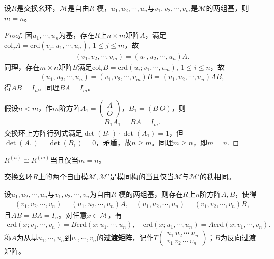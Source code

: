 \documentclass[../../main.tex]{subfiles}%
\begin{document}
\begin{theorem}
设$R$是交换幺环，$\mathscr{M}$是自由$R$-模，$u_1,u_2,\cdots,u_n$与$v_1,v_2,\cdots,v_m$是$\mathscr{M}$的两组基，则$m=n$。
\end{theorem}

\begin{proof}

因$u_1,\cdots,u_n$为基，存在$R$上$n\times m$矩阵$A$，满足$\mathrm{col}_j A=\mathrm{crd}(v_j;u_1,\cdots,u_n),\ 1\leqslant j\leqslant m$，故
\begin{align*}
(v_1,v_2,\cdots,v_m)=(u_1,u_2,\cdots,u_n)A.
\end{align*}
同理，存在$m\times n$矩阵$B$满足$\mathrm{col}_i B=\mathrm{crd}(u_i;v_1,\cdots,v_m),\ 1\leqslant i\leqslant n$，故
\begin{align*}
(u_1,u_2,\cdots,u_n)=(v_1,v_2,\cdots,v_m)B=(u_1,u_2,\cdots,u_n)AB,
\end{align*}
得$AB=I_n$。同理$BA=I_m$。

假设$n<m$，作$m$阶方阵$A_1=\begin{pmatrix}A\\O\end{pmatrix}$，$B_1=(B\ O)$，则
\begin{align*}
B_1 A_1=BA=I_m.
\end{align*}
交换环上方阵行列式满足$\det(B_1)\cdot\det(A_1)=1$，但$\det(A_1)=\det(B_1)=0$，矛盾，故$n\geqslant m$。同理$m\geqslant n$，即$m=n$.

\end{proof}

\begin{corollary}
$R^{(n)}\cong R^{(m)}$当且仅当$m=n$。
\end{corollary}

\begin{corollary}
交换幺环$R$上的两个自由模$\mathscr{M},\mathscr{M}'$是模同构的当且仅当$\mathscr{M}$与$\mathscr{M}'$的秩相同。
\end{corollary}

\begin{corollary}
设$u_1,u_2,\cdots,u_n$与$v_1,v_2,\cdots,v_n$为自由$R$-模的两组基，则存在$R$上$n$阶方阵$A,B$，使得
\begin{align*}
(v_1,v_2,\cdots,v_n)=(u_1,u_2,\cdots,u_n)A,\quad (u_1,u_2,\cdots,u_n)=(v_1,v_2,\cdots,v_n)B,
\end{align*}
且$AB=BA=I_n$。对任意$x\in\mathscr{M}$，有
\begin{align*}
\mathrm{crd}(x;v_1,\cdots,v_n)=B\mathrm{crd}(x;u_1,\cdots,u_n),\quad \mathrm{crd}(x;u_1,\cdots,u_n)=A\mathrm{crd}(x;v_1,\cdots,v_n).
\end{align*}
称$A$为从基$u_1,\cdots,u_n$到$v_1,\cdots,v_n$的\textbf{过渡矩阵}，记作$T\begin{pmatrix}u_1\ u_2\ \cdots\ u_n\\v_1\ v_2\ \cdots\ v_n\end{pmatrix}$；$B$为反向过渡矩阵。
\end{corollary}
\end{document}

